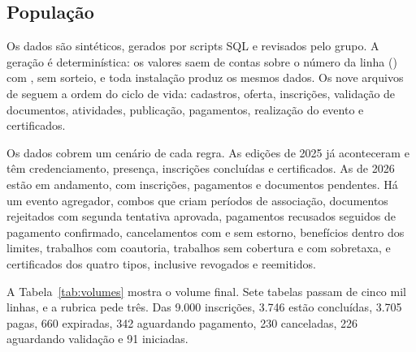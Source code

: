 \subsection{População}

Os dados são sintéticos, gerados por scripts SQL e revisados pelo grupo. A geração é determinística: os valores saem de contas sobre o número da linha () com , sem sorteio, e toda instalação produz os mesmos dados. Os nove arquivos de  seguem a ordem do ciclo de vida: cadastros, oferta, inscrições, validação de documentos, atividades, publicação, pagamentos, realização do evento e certificados.

Os dados cobrem um cenário de cada regra. As edições de 2025 já aconteceram e têm credenciamento, presença, inscrições concluídas e certificados. As de 2026 estão em andamento, com inscrições, pagamentos e documentos pendentes. Há um evento agregador, combos que criam períodos de associação, documentos rejeitados com segunda tentativa aprovada, pagamentos recusados seguidos de pagamento confirmado, cancelamentos com e sem estorno, benefícios dentro dos limites, trabalhos com coautoria, trabalhos sem cobertura e com sobretaxa, e certificados dos quatro tipos, inclusive revogados e reemitidos.

A Tabela~\ref{tab:volumes} mostra o volume final. Sete tabelas passam de cinco mil linhas, e a rubrica pede três. Das 9.000 inscrições, 3.746 estão concluídas, 3.705 pagas, 660 expiradas, 342 aguardando pagamento, 230 canceladas, 226 aguardando validação e 91 iniciadas.

